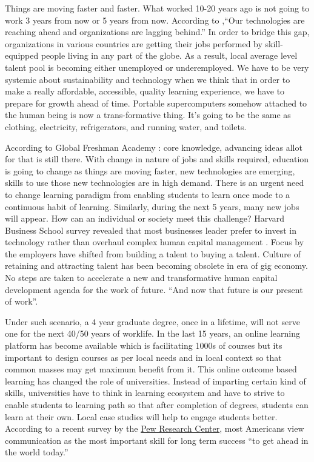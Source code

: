 \documentclass[
]{aft}
\begin{document}
Things are moving faster and faster. What worked 10-20 years ago is not
going to work 3 years from now or 5 years from now. According to
\citet{Brynjolfsson2011RaceAT} ,``Our technologies are reaching ahead
and organizations are lagging behind.'' In order to bridge this gap,
organizations in various countries are getting their jobs performed by
skill-equipped people living in any part of the globe. As a result,
local average level talent pool is becoming either unemployed or
underemployed. We have to be very systemic about sustainability and
technology when we think that in order to make a really affordable,
accessible, quality learning experience, we have to prepare for growth
ahead of time. Portable supercomputers somehow attached to the human
being is now a trans-formative thing. It's going to be the same as
clothing, electricity, refrigerators, and running water, and toilets.

According to Global Freshman Academy : core knowledge, advancing ideas
allot for that is still there. With change in nature of jobs and skills
required, education is going to change as things are moving faster, new
technologies are emerging, skills to use those new technologies are in
high demand. There is an urgent need to change learning paradigm from
enabling students to learn once mode to a continuous habit of learning.
Similarly, during the next 5 years, many new jobs will appear. How can
an individual or society meet this challenge? Harvard Business School
survey revealed that most businesses leader prefer to invest in
technology rather than overhaul complex human capital management
\citet{PorterandRivkin2014} . Focus by the employers have shifted from
building a talent to buying a talent. Culture of retaining and
attracting talent has been becoming obsolete in era of gig economy. No
steps are taken to accelerate a new and transformative human capital
development agenda for the work of future. ``And now that future is our
present of work''.

Under such scenario, a 4 year graduate degree, once in a lifetime, will
not serve one for the next 40/50 years of worklife. In the last 15
years, an online learning platform has become available which is
facilitating 1000s of courses but its important to design courses as per
local needs and in local context so that common masses may get maximum
benefit from it. This online outcome based learning has changed the role
of universities. Instead of imparting certain kind of skills,
universities have to think in learning ecosystem and have to strive to
enable students to learning path so that after completion of degrees,
students can learn at their own. Local case studies will help to engage
students better. According to a recent survey by the
\href{https://www.pewresearch.org/fact-tank/2015/02/19/skills-for-success/}{Pew
Research Center}, most Americans view communication as the most
important skill for long term success ``to get ahead in the world
today.''
\end{document}
